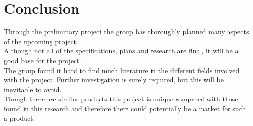 \chapter{Conclusion}
Through the preliminary project the group has thoroughly planned many aspects of the upcoming project.\\ Although not all of the specifications, plans and research are final, it will be a good base for the project.\\ The group found it hard to find much literature in the different fields involved with the project. Further investigation is surely required, but this will be inevitable to avoid.\\ Though there are similar products this project is unique compared with those found in this research and therefore there could potentially be a market for such a product.\\
